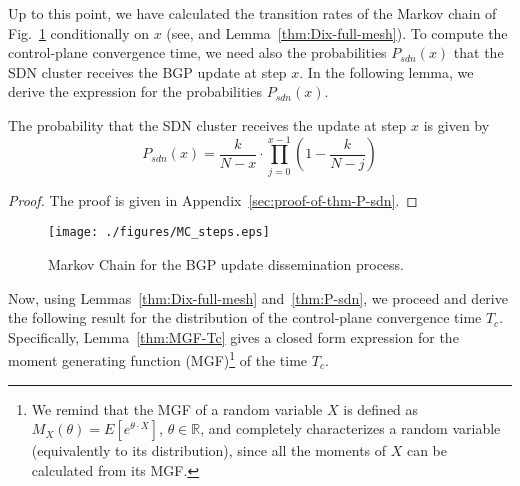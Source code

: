 Up to this point, we have calculated the transition rates of the Markov chain of Fig.~\ref{fig:mc-steps} conditionally on $x$ (see,  and Lemma~\ref{thm:Dix-full-mesh}). To compute the control-plane convergence time, we need also the probabilities $P_{sdn}(x)$ that the SDN cluster receives the BGP update at step $x$. In the following lemma, we derive the expression for the probabilities $P_{sdn}(x)$.

\begin{lemma}\label{thm:P-sdn}
The probability that the SDN cluster receives the update at step $x$ is given by
\begin{equation}\label{eq:P-sdn}
P_{sdn}(x) = \frac{k}{N-x}\cdot \prod_{j=0}^{x-1}\left(1-\frac{k}{N-j}\right)
\end{equation}
\end{lemma}
\begin{proof}
The proof is given in Appendix~\ref{sec:proof-of-thm-P-sdn}.
\end{proof}




%


\begin{figure}
\texttt{[image: ./figures/MC\_steps.eps]}
\caption{Markov Chain for the BGP update dissemination process.}\label{fig:mc-steps}
\end{figure}


Now, using Lemmas~\ref{thm:Dix-full-mesh} and~\ref{thm:P-sdn}, we proceed and derive the following result for the distribution of the control-plane convergence time $T_{c}$. Specifically, Lemma~\ref{thm:MGF-Tc} gives a closed form expression for the moment generating function (MGF)\footnote{
We remind that the MGF of a random variable $X$ is defined as $M_{X}(\theta) = E[e^{\theta\cdot X}]$, $\theta\in\mathbb{R}$, and completely characterizes a random variable (equivalently to its distribution), since all the moments of $X$ can be calculated from its MGF.%
} of the time $T_{c}$.

